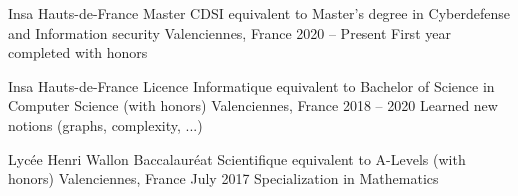 
\begin{cventries}
  \cventry
    {Insa Hauts-de-France} %
    {Master CDSI equivalent to Master's degree in Cyberdefense and Information security} %
    {Valenciennes, France} %
    {2020 – Present} %
    {First year completed with honors}
    
  \cventry
    {Insa Hauts-de-France} %
    {Licence Informatique equivalent to Bachelor of Science in Computer Science (with honors)} %
    {Valenciennes, France} %
    {2018 – 2020} %
    {Learned new notions (graphs, complexity, ...)}

  \cventry
    {Lycée Henri Wallon} %
    {Baccalauréat Scientifique equivalent to A-Levels (with honors)} %
    {Valenciennes, France} %
    {July 2017} %
    {Specialization in Mathematics}
\end{cventries}
